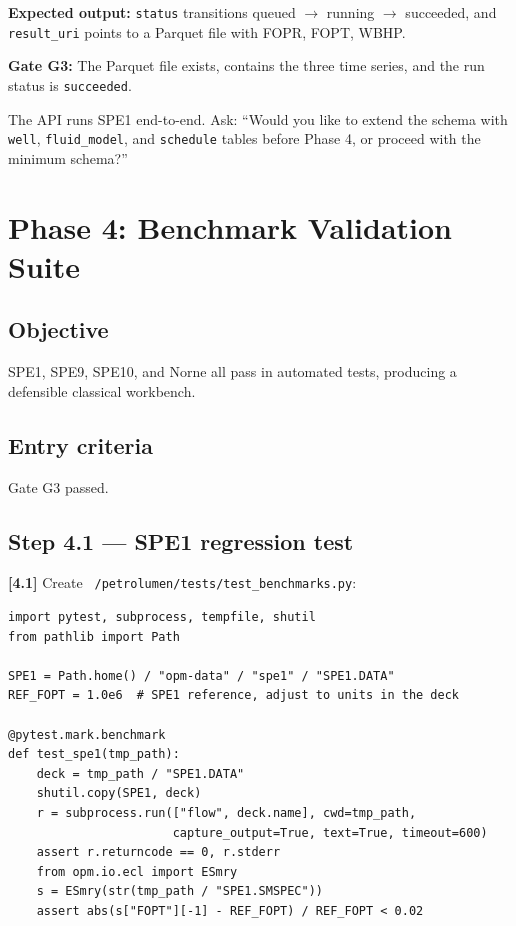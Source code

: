 \documentclass[10pt,a4paper]{article}
\newcommand{\stepID}[1]{\textsf{\textbf{[#1]}}}
\newcommand{\cmd}[1]{\texttt{#1}}
\newcommand{\file}[1]{\texttt{#1}}
\begin{document}
\textbf{Expected output:} \cmd{status} transitions queued $\to$ running $\to$ succeeded, and \cmd{result\_uri} points to a Parquet file with FOPR, FOPT, WBHP.

\begin{gate}
\textbf{Gate G3:} The Parquet file exists, contains the three time series, and the run status is \cmd{succeeded}.
\end{gate}

\begin{aicheckpoint}
The API runs SPE1 end-to-end. Ask: ``Would you like to extend the schema with \cmd{well}, \cmd{fluid\_model}, and \cmd{schedule} tables before Phase 4, or proceed with the minimum schema?''
\end{aicheckpoint}

\section{Phase 4: Benchmark Validation Suite}
\label{sec:phase4}

\subsection{Objective}
SPE1, SPE9, SPE10, and Norne all pass in automated tests, producing a defensible classical workbench.

\subsection{Entry criteria}
Gate G3 passed.

\subsection{Step 4.1 --- SPE1 regression test}

\stepID{4.1} Create \file{~/petrolumen/tests/test\_benchmarks.py}:

\begin{lstlisting}
import pytest, subprocess, tempfile, shutil
from pathlib import Path

SPE1 = Path.home() / "opm-data" / "spe1" / "SPE1.DATA"
REF_FOPT = 1.0e6  # SPE1 reference, adjust to units in the deck

@pytest.mark.benchmark
def test_spe1(tmp_path):
    deck = tmp_path / "SPE1.DATA"
    shutil.copy(SPE1, deck)
    r = subprocess.run(["flow", deck.name], cwd=tmp_path,
                       capture_output=True, text=True, timeout=600)
    assert r.returncode == 0, r.stderr
    from opm.io.ecl import ESmry
    s = ESmry(str(tmp_path / "SPE1.SMSPEC"))
    assert abs(s["FOPT"][-1] - REF_FOPT) / REF_FOPT < 0.02
\end{lstlisting}
\end{document}

